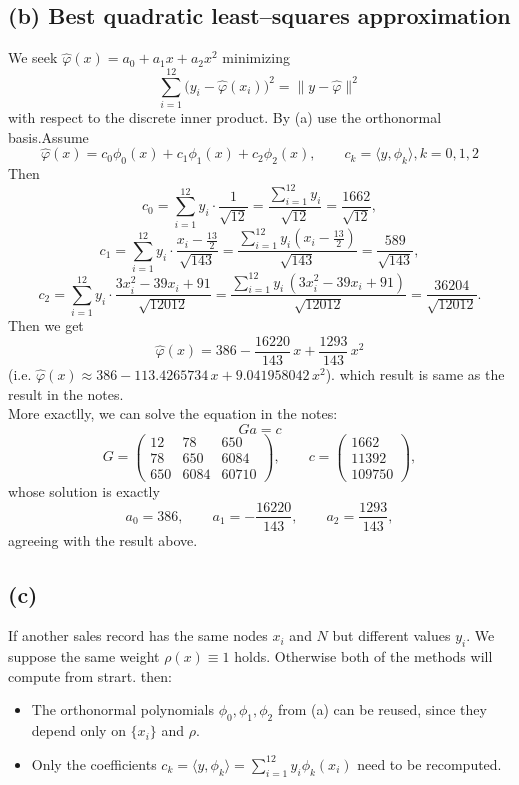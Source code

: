 \documentclass[a4paper]{article}
\begin{document}
\subsection*{(b) Best quadratic least--squares approximation}
We seek $\hat\varphi(x)=a_0+a_1x+a_2x^2$ minimizing
\[
\sum_{i=1}^{12}\bigl(y_i-\hat\varphi(x_i)\bigr)^2
=\|y-\hat\varphi\|^2
\]
with respect to the discrete inner product.
By (a) use the orthonormal basis.Assume
\[
\hat\varphi(x)=c_0\phi_0(x)+c_1\phi_1(x)+c_2\phi_2(x),
\qquad
c_k=\langle y,\phi_k\rangle,k = 0,1,2
\]
Then
\[
c_0=\sum_{i=1}^{12} y_i\cdot \frac1{\sqrt{12}}
=\frac{\sum_{i=1}^{12}y_i}{\sqrt{12}}
=\frac{1662}{\sqrt{12}},
\]
\[
c_1=\sum_{i=1}^{12} y_i\cdot \frac{x_i-\frac{13}{2}}{\sqrt{143}}
=\frac{\sum_{i=1}^{12} y_i\left(x_i-\frac{13}{2}\right)}{\sqrt{143}}
=\frac{589}{\sqrt{143}},
\]
\[
c_2=\sum_{i=1}^{12} y_i\cdot \frac{3x_i^2-39x_i+91}{\sqrt{12012}}
=\frac{\sum_{i=1}^{12} y_i\,(3x_i^2-39x_i+91)}{\sqrt{12012}}
=\frac{36204}{\sqrt{12012}}.
\]
Then we get
\[
\boxed{
\hat\varphi(x)=386-\frac{16220}{143}\,x+\frac{1293}{143}\,x^2
}
\]
(i.e. $\hat\varphi(x)\approx 386-113.4265734\,x+9.041958042\,x^2$).
which result is same as the result in the notes. \\
More exactlly, we can solve the equation in the notes:
\[
Ga = c
\]
\[
G=
\begin{pmatrix}
12&78&650\\
78&650&6084\\
650&6084&60710
\end{pmatrix},
\qquad
c=
\begin{pmatrix}
1662\\
11392\\
109750
\end{pmatrix},
\]
whose solution is exactly
\[
a_0=386,\qquad a_1=-\frac{16220}{143},\qquad a_2=\frac{1293}{143},
\]
agreeing with the result above.

\subsection*{(c)}
If another sales record has the same nodes $x_i$ and $N$ 
but different values $y_i$. We suppose the same weight $\rho(x)\equiv 1$ holds.
Otherwise both of the methods will compute from strart.
then:
\begin{itemize}
\item The orthonormal polynomials $\phi_0,\phi_1,\phi_2$ from (a) can be reused,
since they depend only on $\{x_i\}$ and $\rho$.
\item Only the coefficients $c_k=\langle y,\phi_k\rangle=\sum_{i=1}^{12}y_i\phi_k(x_i)$
need to be recomputed.
\end{itemize}
\end{document}
